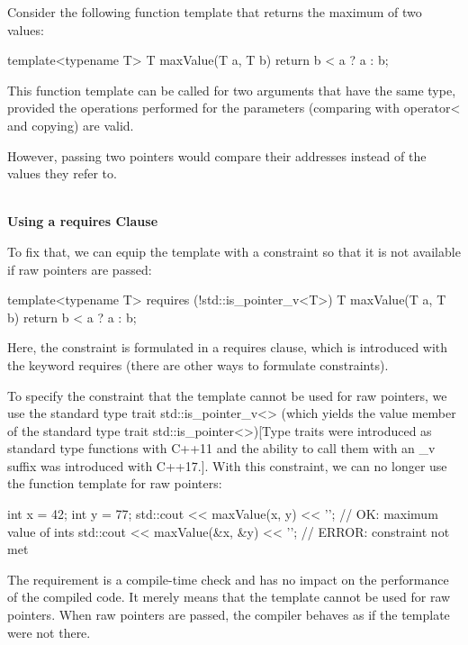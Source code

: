 

Consider the following function template that returns the maximum of two values:

\begin{cpp}
template<typename T>
T maxValue(T a, T b) {
	return b < a ? a : b;
}
\end{cpp}

This function template can be called for two arguments that have the same type, provided the operations performed for the parameters (comparing with operator< and copying) are valid.

However, passing two pointers would compare their addresses instead of the values they refer to.


\noindent
\hspace*{\fill} \\ %
\textbf{Using a requires Clause}


To fix that, we can equip the template with a constraint so that it is not available if raw pointers are passed:

\begin{cpp}
template<typename T>
requires (!std::is_pointer_v<T>)
T maxValue(T a, T b)
{
	return b < a ? a : b;
}
\end{cpp}

Here, the constraint is formulated in a requires clause, which is introduced with the keyword requires (there are other ways to formulate constraints).

To specify the constraint that the template cannot be used for raw pointers, we use the standard type trait std::is\_pointer\_v<> (which yields the value member of the standard type trait std::is\_pointer<>)[Type traits were introduced as standard type functions with C++11 and the ability to call them with an \_v suffix was introduced with C++17.]. With this constraint, we can no longer use the function template for raw pointers:

\begin{cpp}
int x = 42;
int y = 77;
std::cout << maxValue(x, y) << '\n'; // OK: maximum value of ints
std::cout << maxValue(&x, &y) << '\n'; // ERROR: constraint not met
\end{cpp}

The requirement is a compile-time check and has no impact on the performance of the compiled code. It merely means that the template cannot be used for raw pointers. When raw pointers are passed, the compiler behaves as if the template were not there.

